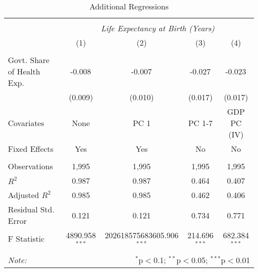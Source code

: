 \begin{table}[!htbp] \centering
  \caption{Additional Regressions \label{additional_regs}}
\begin{tabular}{@{\extracolsep{5pt}}lcccc}
\\[-1.8ex]\hline
\hline \\[-1.8ex]
& \multicolumn{4}{c}{\textit{Life Expectancy at Birth (Years)}} \
\cr \
\\[-1.8ex] & (1) & (2) & (3) & (4) \\
\hline \\[-1.8ex]
 Govt. Share of Health Exp. & -0.008$^{}$ & -0.007$^{}$ & -0.027$^{}$ & -0.023$^{}$ \\
  & (0.009) & (0.010) & (0.017) & (0.017) \\
 Covariates & None & PC 1 & PC 1-7 & GDP PC (IV) \\
 Fixed Effects & Yes & Yes & No & No \\
\hline \\[-1.8ex]
 Observations & 1,995 & 1,995 & 1,995 & 1,995 \\
 $R^2$ & 0.987 & 0.987 & 0.464 & 0.407 \\
 Adjusted $R^2$ & 0.985 & 0.985 & 0.462 & 0.406 \\
 Residual Std. Error & 0.121 & 0.121 & 0.734 & 0.771  \\
 F Statistic & 4890.958$^{***}$  & 202618575683605.906$^{***}$  & 214.696$^{***}$  & 682.384$^{***}$  \\
\hline
\hline \\[-1.8ex]
\textit{Note:} & \multicolumn{4}{r}{$^{*}$p$<$0.1; $^{**}$p$<$0.05; $^{***}$p$<$0.01} \\
\end{tabular}
\end{table}